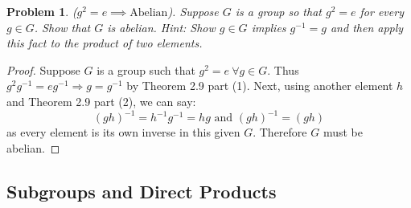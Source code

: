 \documentclass[12pt]{article}
\newtheorem{problem}{Problem}
\numberwithin{problem}{section} %
\theoremstyle{remark}  %
\newenvironment{answer}
    {\begin{adjustwidth}{0pt}{0pt}}
    {\end{adjustwidth}}
\begin{document}
\setcounter{problem}{44}
    \begin{problem} ($g^2=e\implies\text{Abelian}$).
        Suppose $G$ is a group so that $g^2=e$ for every $g\in G$. Show that $G$ is abelian. Hint: Show $g\in G$ implies $g^{-1}=g$ and then apply this fact to the product of two elements.
    \end{problem}
    \begin{answer}
        \begin{proof}
            Suppose $G$ is a group such that $g^2=e\ \forall g\in G$. Thus $g^2g^{-1}=eg^{-1}\Rightarrow g = g^{-1}$ by Theorem 2.9 part (1). Next, using another element $h$ and Theorem 2.9 part (2), we can say: $$
                (gh)^{-1} = h^{-1}g^{-1} = hg \text{ and } (gh)^{-1} = (gh)
            $$ as every element is its own inverse in this given $G$. Therefore $G$ must be abelian.
        \end{proof}
    \end{answer}


\subsection{Subgroups and Direct Products}
\end{document}
